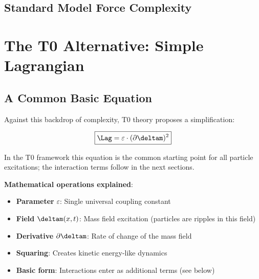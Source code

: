 	\subsection{Standard Model Force Complexity}
	
	\begin{table}[htbp]
		\centering
		\caption{Standard Model force complexity}
		\label{tab:sm_force_complexity}
	\end{table}
	
	\section{The T0 Alternative: Simple Lagrangian}
	
	\subsection{A Common Basic Equation}
	
	Against this backdrop of complexity, T0 theory proposes a simplification:
	
	\begin{equation}
		\boxed{\Lag = \varepsilon \cdot (\partial \deltam)^2}
		\label{eq:revolutionary_lagrangian}
	\end{equation}
	
	In the T0 framework this equation is the common starting point for all particle excitations; the interaction terms follow in the next sections.
	
	\textbf{Mathematical operations explained}:
	\begin{itemize}
		\item \textbf{Parameter} $\varepsilon$: Single universal coupling constant
		\item \textbf{Field} $\deltam(x,t)$: Mass field excitation (particles are ripples in this field)
		\item \textbf{Derivative} $\partial \deltam$: Rate of change of the mass field
		\item \textbf{Squaring}: Creates kinetic energy-like dynamics
		\item \textbf{Basic form}: Interactions enter as additional terms (see below)
	\end{itemize}
	
